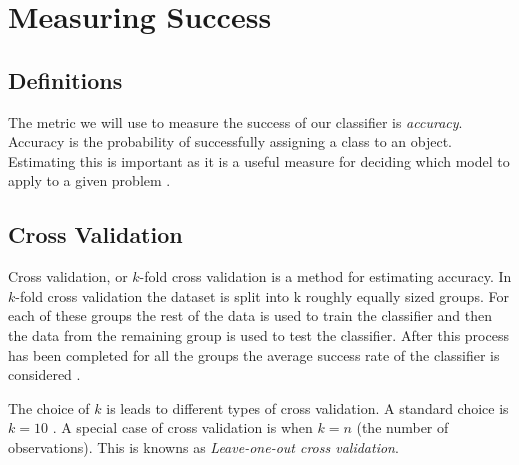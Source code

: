 \chapter{Measuring Success}

\section{Definitions}

The metric we will use to measure the success of our classifier is \textit{accuracy}. Accuracy is the probability of successfully assigning a class to an object. Estimating this is important as it is a useful measure for deciding which model to apply to a given problem \cite{Kohavi95}.

\section{Cross Validation}

Cross validation, or $k$-fold cross validation is a method for estimating accuracy. In $k$-fold cross validation the dataset is split into k roughly equally sized groups. For each of these groups the rest of the data is used to train the classifier and then the  data from the remaining group is used to test the classifier. After this process has been completed for all the groups the average success rate of the classifier is considered \cite{Priddy05}.

The choice of $k$ is leads to different types of cross validation. A standard choice is $k=10$ \cite{Priddy05}. A special case of cross validation is when $k=n$ (the number of observations). This is knowns as \textit{Leave-one-out cross validation}.